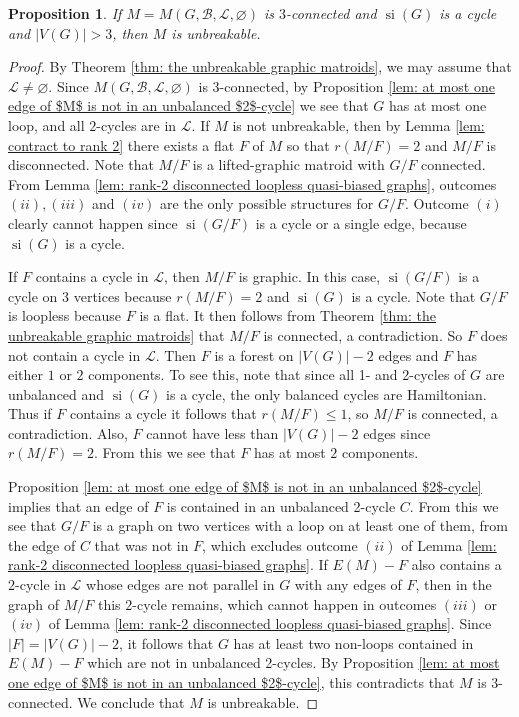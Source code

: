 \documentclass[12pt]{article}
\newtheorem{proposition}[theorem]{Proposition}
\theoremstyle{definition}
\theoremstyle{plain} %
\newcommand{\cB}{\mathcal{B}}
\newcommand{\cL}{\mathcal{L}}
\DeclareMathOperator{\si}{si}
\begin{document}
\begin{proposition} \label{prop: connected lifted graphic si(G) is a cycle}
If $M = M(G, \cB, \cL, \varnothing)$ is $3$-connected and $\si(G)$ is a cycle and $|V(G)| > 3$, then $M$ is unbreakable.
\end{proposition}
\begin{proof}
  By Theorem \ref{thm: the unbreakable graphic matroids}, we may assume that $\cL\neq\varnothing$. Since $M(G,\cB,\cL,\varnothing)$ is $3$-connected, by Proposition \ref{lem: at most one edge of $M$ is not in an unbalanced $2$-cycle} we see that $G$ has at most one loop, and all $2$-cycles are in $\cL$. If $M$ is not unbreakable, then by Lemma \ref{lem: contract to rank 2} there exists a flat $F$ of $M$ so that $r(M/F)=2$ and $M/F$ is disconnected. Note that $M/F$ is a lifted-graphic matroid with $G/F$ connected. From Lemma \ref{lem: rank-2 disconnected loopless quasi-biased graphs}, outcomes $(ii),(iii)$ and $(iv)$ are the only possible structures for $G/F$. Outcome $(i)$ clearly cannot happen since $\si(G/F)$ is a cycle or a single edge, because $\si(G)$ is a cycle. 

  If $F$ contains a cycle in $\cL$, then $M/F$ is graphic. In this case, $\si(G/F)$ is a cycle on $3$ vertices because $r(M/F) = 2$ and $\si(G)$ is a cycle.
  Note that $G/F$ is loopless because $F$ is a flat.
  It then follows from Theorem \ref{thm: the unbreakable graphic matroids} that $M/F$ is connected, a contradiction. 
  So $F$ does not contain a cycle in $\cL$. 
  Then $F$ is a forest on $|V(G)|-2$ edges and $F$ has either $1$ or $2$ components. To see this, note that since all 1- and 2-cycles of $G$ are unbalanced and $\si(G)$ is a cycle, the only balanced cycles are Hamiltonian. Thus if $F$ contains a cycle it follows that $r(M/F)\leq1$, so $M/F$ is connected, a contradiction. Also, $F$ cannot have less than $|V(G)|-2$ edges since $r(M/F)=2$. From this we see that $F$ has at most $2$ components. 

  Proposition \ref{lem: at most one edge of $M$ is not in an unbalanced $2$-cycle} implies that an edge of $F$ is contained in an unbalanced 2-cycle $C$. From this we see that $G/F$ is a graph on two vertices with a loop on at least one of them, from the edge of $C$ that was not in $F$, which excludes outcome $(ii)$ of Lemma \ref{lem: rank-2 disconnected loopless quasi-biased graphs}. If $E(M)-F$ also contains a $2$-cycle in $\cL$ whose edges are not parallel in $G$ with any edges of $F$, then in the graph of $M/F$ this $2$-cycle remains, which cannot happen in outcomes $(iii)$ or $(iv)$ of Lemma \ref{lem: rank-2 disconnected loopless quasi-biased graphs}. Since $\lvert F\rvert=\lvert V(G)\rvert-2$, it follows that $G$ has at least two non-loops contained in $E(M)-F$ which are not in unbalanced 2-cycles. By Proposition \ref{lem: at most one edge of $M$ is not in an unbalanced $2$-cycle}, this contradicts that $M$ is 3-connected. We conclude that $M$ is unbreakable.
\end{proof}
\end{document}
